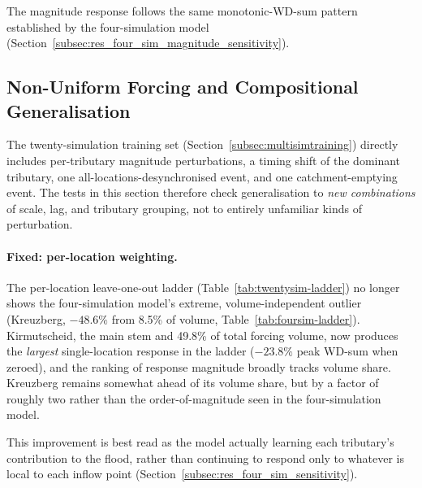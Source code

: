 \documentclass[12pt,a4paper]{report}
\begin{document}
{The magnitude response follows the same monotonic-WD-sum pattern established by the
four-simulation model (Section~\ref{subsec:res_four_sim_magnitude_sensitivity}).
 
 
\subsection{Non-Uniform Forcing and Compositional Generalisation}
\label{subsec:res_twenty_sim_nonuniform}
 
The twenty-simulation training set (Section~\ref{subsec:multisimtraining}) directly
includes per-tributary magnitude perturbations, a timing shift of the dominant
tributary, one all-locations-desynchronised event, and one catchment-emptying event.
The tests in this section therefore check generalisation to \emph{new combinations} of
scale, lag, and tributary grouping, not to entirely unfamiliar kinds of perturbation.
 
\paragraph{Fixed: per-location weighting.}
The per-location leave-one-out ladder (Table~\ref{tab:twentysim-ladder}) no longer shows the
four-simulation model's extreme, volume-independent outlier (Kreuzberg, $-48.6\%$ from
8.5\% of volume, Table~\ref{tab:foursim-ladder}). Kirmutscheid, the main stem and
49.8\% of total forcing volume, now produces the \emph{largest} single-location
response in the ladder ($-23.8\%$ peak WD-sum when zeroed), and the ranking of
response magnitude broadly tracks volume share. Kreuzberg remains somewhat ahead of its volume share, but by a
factor of roughly two rather than the order-of-magnitude seen in the four-simulation
model. 
 
This improvement is best read as the model actually learning each
tributary's contribution to the flood, rather than continuing to respond only to
whatever is local to each inflow point (Section~\ref{subsec:res_four_sim_sensitivity}).
 
}
\end{document}
